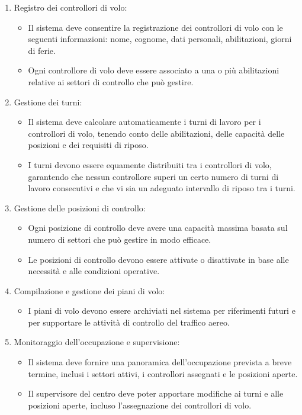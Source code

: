 \begin{enumerate}
\item Registro dei controllori di volo:
\begin{itemize}
\item Il sistema deve consentire la registrazione dei controllori di volo con le seguenti informazioni: nome, cognome, dati personali, abilitazioni, giorni di ferie.
\item Ogni controllore di volo deve essere associato a una o più abilitazioni relative ai settori di controllo che può gestire.
\end{itemize}

\item Gestione dei turni:
\begin{itemize}
\item Il sistema deve calcolare automaticamente i turni di lavoro per i controllori di volo, tenendo conto delle abilitazioni, delle capacità delle posizioni e dei requisiti di riposo.
\item I turni devono essere equamente distribuiti tra i controllori di volo, garantendo che nessun controllore superi un certo numero di turni di lavoro consecutivi e che vi sia un adeguato intervallo di riposo tra i turni.
\end{itemize}

\item Gestione delle posizioni di controllo:
\begin{itemize}
\item Ogni posizione di controllo deve avere una capacità massima basata sul numero di settori che può gestire in modo efficace.
\item Le posizioni di controllo devono essere attivate o disattivate in base alle necessità e alle condizioni operative.
\end{itemize}

\item Compilazione e gestione dei piani di volo:
\begin{itemize}
\item I piani di volo devono essere archiviati nel sistema per riferimenti futuri e per supportare le attività di controllo del traffico aereo.
\end{itemize}

\item Monitoraggio dell'occupazione e supervisione:
\begin{itemize}
\item Il sistema deve fornire una panoramica dell'occupazione prevista a breve termine, inclusi i settori attivi, i controllori assegnati e le posizioni aperte.
\item Il supervisore del centro deve poter apportare modifiche ai turni e alle posizioni aperte, incluso l'assegnazione dei controllori di volo.
\end{itemize}
\end{enumerate}

